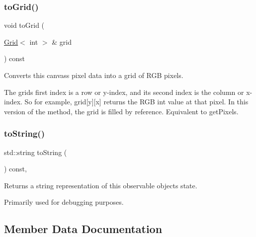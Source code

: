 \subsubsection{\texorpdfstring{to\+Grid()}{toGrid()}\hspace{0.1cm}{\footnotesize\ttfamily [2/2]}}
{\footnotesize\ttfamily void to\+Grid (\begin{DoxyParamCaption}\item[{\mbox{\hyperlink{classGrid}{Grid}}$<$ int $>$ \&}]{grid }\end{DoxyParamCaption}) const\hspace{0.3cm}{\ttfamily [virtual]}}



Converts this canvas\textquotesingle{}s pixel data into a grid of R\+GB pixels. 

The grid\textquotesingle{}s first index is a row or y-\/index, and its second index is the column or x-\/index. So for example, grid\mbox{[}y\mbox{]}\mbox{[}x\mbox{]} returns the R\+GB int value at that pixel. In this version of the method, the grid is filled by reference. Equivalent to get\+Pixels. \mbox{\label{classGObservable_a1fe5121d6528fdea3f243321b3fa3a49}} 
\subsubsection{\texorpdfstring{to\+String()}{toString()}}
{\footnotesize\ttfamily std\+::string to\+String (\begin{DoxyParamCaption}{ }\end{DoxyParamCaption}) const\hspace{0.3cm}{\ttfamily [virtual]}, {\ttfamily [inherited]}}



Returns a string representation of this observable object\textquotesingle{}s state. 

Primarily used for debugging purposes. 

\subsection{Member Data Documentation}
\mbox{\label{classGDrawingSurface_a738dd6afc69ac536ad46cf4d89a90933}} 
